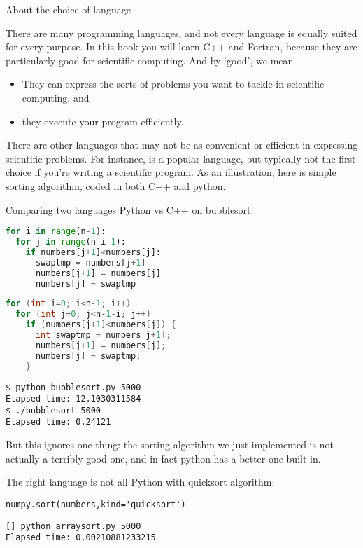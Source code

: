  {About the choice of language}

There are many programming languages, and not every language is
equally suited for every purpose. In this book you will learn C++ and
Fortran, because they are particularly good for scientific computing.
And by `good', we mean
\begin{itemize}
\item They can express the sorts of problems you want to tackle in
  scientific computing, and
\item they execute your program efficiently.
\end{itemize}

There are other languages that may not be as convenient or efficient
in expressing scientific problems. For instance,  is
a popular language, but typically not the first choice if you're
writing a scientific program. As an illustration, here is simple
sorting algorithm, coded in both C++ and python.

\begin{block}{Comparing two languages}
  \label{sl:languages}
  Python vs C++ on bubblesort:
  \begin{multicols}{2}
    \scriptsize
\begin{lstlisting}[language=Python]
for i in range(n-1):
  for j in range(n-i-1):
    if numbers[j+1]<numbers[j]:
      swaptmp = numbers[j+1]
      numbers[j+1] = numbers[j]
      numbers[j] = swaptmp
\end{lstlisting}
    \columnbreak
\begin{lstlisting}[language=C++]
for (int i=0; i<n-1; i++)
  for (int j=0; j<n-1-i; j++)
    if (numbers[j+1]<numbers[j]) {
      int swaptmp = numbers[j+1];
      numbers[j+1] = numbers[j];
      numbers[j] = swaptmp;
    }
\end{lstlisting}
  \end{multicols}
\begin{verbatim}
$ python bubblesort.py 5000
Elapsed time: 12.1030311584
$ ./bubblesort 5000
Elapsed time: 0.24121
\end{verbatim}
\end{block}

But this ignores one thing: the sorting algorithm we just implemented
is not actually a terribly good one, and in fact python has a better
one built-in.

\begin{block}{The right language is not all}
\label{sl:quick-algo}
Python with quicksort algorithm:
\begin{verbatim}
numpy.sort(numbers,kind='quicksort')
\end{verbatim}  
\begin{verbatim}
[] python arraysort.py 5000
Elapsed time: 0.00210881233215
\end{verbatim}
\end{block}

